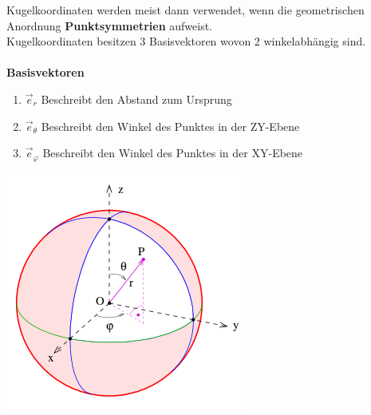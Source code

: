  {}
\beginip
Kugelkoordinaten werden meist dann verwendet, wenn die geometrischen Anordnung \textbf{Punktsymmetrien} aufweist. \\
Kugelkoordinaten besitzen 3 Basisvektoren wovon 2 winkelabhängig sind. \\
\\
\textbf{Basisvektoren}
\begin{enumerate}
	\item $\vec{e}_r$ Beschreibt den Abstand zum Ursprung
	\item $\vec{e}_\theta$ Beschreibt den Winkel des Punktes in der ZY-Ebene
	\item $\vec{e}_\varphi$ Beschreibt den Winkel des Punktes in der XY-Ebene
\end{enumerate}
\begin{center}
	\includegraphics[scale = 0.5	]{kugelkoord.png}
\end{center}


\iend
\newpage
{}


\beginip


